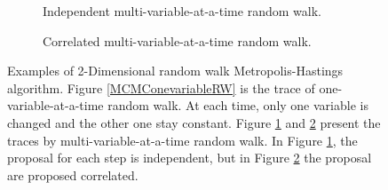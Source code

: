\begin{figure}[h]
\begin{subfigure}[b]{0.32\textwidth}
    \caption{\footnotesize Independent multi-variable-at-a-time random walk.}\label{MCMCMultivariableRW}
\end{subfigure}
\begin{subfigure}[b]{0.32\textwidth}
  \caption{\footnotesize Correlated multi-variable-at-a-time random walk.}\label{MCMCCorrelatedRW}
\end{subfigure}
\caption{Examples of 2-Dimensional random walk Metropolis-Hastings algorithm. Figure \ref{MCMConevariableRW} is the trace of one-variable-at-a-time random walk. At each time, only one variable is changed and the other one stay constant. Figure \ref{MCMCMultivariableRW} and \ref{MCMCCorrelatedRW} present the traces by multi-variable-at-a-time random walk. In Figure \ref{MCMCMultivariableRW}, the proposal for each step is independent, but in Figure \ref{MCMCCorrelatedRW} the proposal are proposed correlated.}
\label{randomwalk}
\end{figure}

